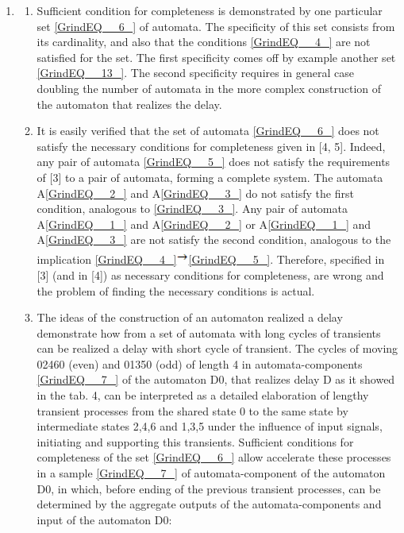 \documentclass{article}
\begin{document}
\begin{enumerate}
\item \begin{enumerate}
\item \textbf{ }Sufficient condition for completeness is demonstrated by one particular set \eqref{GrindEQ__6_} of automata. The specificity of this set consists from its cardinality, and also that the conditions \eqref{GrindEQ__4_} are not satisfied for the set. The first specificity comes off by example another set \eqref{GrindEQ__13_}. The second specificity requires in general case doubling the number of automata in the more complex construction of the automaton that realizes the delay.

\item  It is easily verified that the set of automata \eqref{GrindEQ__6_} does not satisfy the necessary conditions for completeness given in [4, 5]. Indeed, any pair of automata \eqref{GrindEQ__5_} does not satisfy the requirements of [3] to a pair of automata, forming a complete system. The automata A\eqref{GrindEQ__2_} and A\eqref{GrindEQ__3_} do not satisfy the first condition, analogous to \eqref{GrindEQ__3_}. Any pair of automata A\eqref{GrindEQ__1_} and A\eqref{GrindEQ__2_} or A\eqref{GrindEQ__1_} and A\eqref{GrindEQ__3_} are not satisfy the second condition, analogous to the implication \eqref{GrindEQ__4_}\includegraphics[bb=0mm 0mm 208mm 296mm, width=4.0mm, height=5.4mm, viewport=3mm 4mm 205mm 292mm]{image14}\eqref{GrindEQ__5_}. Therefore, specified in [3] (and in [4]) as necessary conditions for completeness, are wrong and the problem of finding the necessary conditions is actual.

\item  The ideas of the construction of an automaton realized a delay demonstrate how from a set of automata with long cycles of transients can be realized a delay with short cycle of transient. The cycles of moving 02460 (even) and 01350 (odd) of length 4 in automata-components \eqref{GrindEQ__7_} of the automaton D0, that realizes delay D as it showed in the tab. 4, can be interpreted as a detailed elaboration of lengthy transient processes from the shared state 0 to the same state by intermediate states 2,4,6 and 1,3,5 under the influence of input signals, initiating and supporting this transients. Sufficient conditions for completeness of the set \eqref{GrindEQ__6_} allow accelerate these processes in a sample \eqref{GrindEQ__7_} of automata-component of the automaton D0, in which, before ending of the previous transient processes, can be determined by the aggregate outputs of the automata-components and input of the automaton D0:
\end{enumerate}


\end{enumerate}
\end{document}

